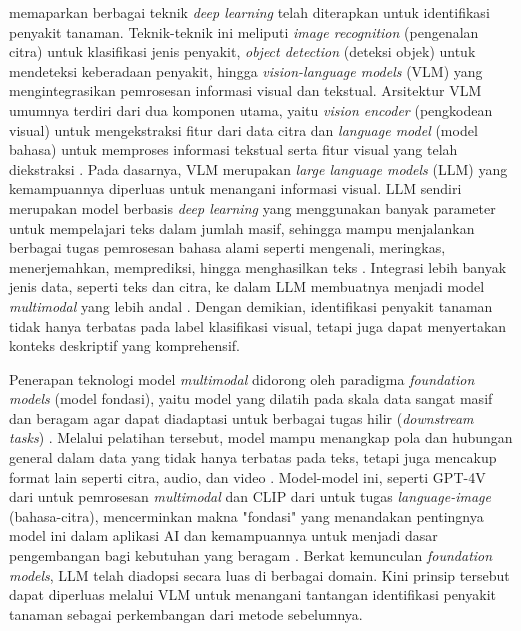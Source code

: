 \textcite{upadhyayDeepLearningComputer2025} memaparkan berbagai teknik \textit{deep learning} telah diterapkan untuk identifikasi penyakit tanaman. Teknik-teknik ini meliputi \textit{image recognition} (pengenalan citra) untuk klasifikasi jenis penyakit, \textit{object detection} (deteksi objek) untuk mendeteksi keberadaan penyakit, hingga \textit{vision-language models} (VLM) yang mengintegrasikan pemrosesan informasi visual dan tekstual. Arsitektur VLM umumnya terdiri dari dua komponen utama, yaitu \textit{vision encoder} (pengkodean visual) untuk mengekstraksi fitur dari data citra dan \textit{language model} (model bahasa) untuk memproses informasi tekstual serta fitur visual yang telah diekstraksi \parencite{bordesIntroductionVisionLanguageModeling2024}. Pada dasarnya, VLM merupakan \textit{large language models} (LLM) yang kemampuannya diperluas untuk menangani informasi visual. LLM sendiri merupakan model berbasis \textit{deep learning} yang menggunakan banyak parameter untuk mempelajari teks dalam jumlah masif, sehingga mampu menjalankan berbagai tugas pemrosesan bahasa alami seperti mengenali, meringkas, menerjemahkan, memprediksi, hingga menghasilkan teks \parencite{altoBuildingLLMPowerd2024}. Integrasi lebih banyak jenis data, seperti teks dan citra, ke dalam LLM membuatnya menjadi model \textit{multimodal} yang lebih andal \parencite{huyenAIEngineeringBuilding2025}. Dengan demikian, identifikasi penyakit tanaman tidak hanya terbatas pada label klasifikasi visual, tetapi juga dapat menyertakan konteks deskriptif yang komprehensif.

Penerapan teknologi model \textit{multimodal} didorong oleh paradigma \textit{foundation models} (model fondasi), yaitu model yang dilatih pada skala data sangat masif dan beragam agar dapat diadaptasi untuk berbagai tugas hilir (\textit{downstream tasks}) \parencite{bommasaniOpportunitiesRisksFoundation2022}. Melalui pelatihan tersebut, model mampu menangkap pola dan hubungan general dalam data yang tidak hanya terbatas pada teks, tetapi juga mencakup format lain seperti citra, audio, dan video \parencite{altoBuildingLLMPowerd2024}. Model-model ini, seperti GPT-4V dari \textcite{openaiGPT4VSystemCard2023} untuk pemrosesan \textit{multimodal} dan CLIP dari \textcite{radfordLearningTransferableVisual2021} untuk tugas \textit{language-image} (bahasa-citra), mencerminkan makna "fondasi" yang menandakan pentingnya model ini dalam aplikasi AI dan kemampuannya untuk menjadi dasar pengembangan bagi kebutuhan yang beragam \parencite{huyenAIEngineeringBuilding2025}. Berkat kemunculan \textit{foundation models}, LLM telah diadopsi secara luas di berbagai domain. Kini prinsip tersebut dapat diperluas melalui VLM untuk menangani tantangan identifikasi penyakit tanaman sebagai perkembangan dari metode sebelumnya. 

